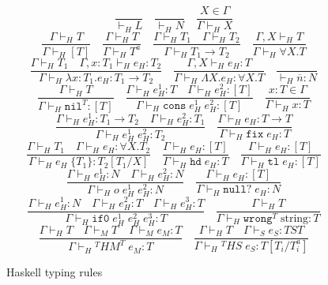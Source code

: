 \begin{figure}[p]
\[
\frac{}{\vdash_{H}L}
\quad
\frac{}{\vdash_{H}N}
\quad
\frac{X\in\Gamma}{\Gamma\vdash_{H}X}
\]
\[
\frac{\Gamma\vdash_{H}T}{\Gamma\vdash_{H}[T]}
\quad
\frac{\Gamma\vdash_{H}T}{\Gamma\vdash_{H}T^{a}}
\quad
\frac{\Gamma\vdash_{H}T_{1}\quad\Gamma\vdash_{H}T_{2}}{\Gamma\vdash_{H}T_{1}\rightarrow T_{2}}
\quad
\frac{\Gamma ,X\vdash_{H}T}{\Gamma\vdash_{H}\forall X.T}
\]
\bigskip
\[
\frac{\Gamma\vdash_{H}T_{1}\quad\Gamma,x:T_{1}\vdash_{H}e_{H}:T_{2}}{\Gamma\vdash_{H}\lambda x:T_{1}.e_{H}:T_{1}\rightarrow T_{2}}
\quad
\frac{\Gamma,X\vdash_{H}e_{H}:T}{\Gamma\vdash_{H}\Lambda X.e_{H}:\forall X.T}
\quad
\frac{}{\vdash_{H}\overline{n}:N}
\]
\[
\frac{\Gamma\vdash_{H}T}{\Gamma\vdash_{H}\mathtt{nil}^{T}:[T]}
\quad
\frac{\Gamma\vdash_{H}e_{H}^{1}:T\quad\Gamma\vdash_{H}e_{H}^{2}:[T]}{\Gamma\vdash_{H}\mathtt{cons}\;e_{H}^{1}\;e_{H}^{2}:[T]}
\quad
\frac{x:T\in\Gamma}{\Gamma\vdash_{H}x:T}
\]
\[
\frac{\Gamma\vdash_{H}e_{H}^{1}:T_{1}\rightarrow T_{2}\quad\Gamma\vdash_{H}e_{H}^{2}:T_{1}}{\Gamma\vdash_{H}e_{H}^{1}\;e_{H}^{2}:T_{2}}
\quad
\frac{\Gamma\vdash_{H}e_{H}:T\rightarrow T}{\Gamma\vdash_{H}\mathtt{fix}\;e_{H}:T}
\]
\[
\frac{\Gamma\vdash_{H}T_{1}\quad\Gamma\vdash_{H}e_{H}:\forall X.T_{2}}{\Gamma\vdash_{H}e_{H}\;\lbrace T_{1}\rbrace:T_{2}[T_{1}/X]}
\quad
\frac{\Gamma\vdash_{H}e_{H}:[T]}{\Gamma\vdash_{H}\mathtt{hd}\;e_{H}:T}
\quad
\frac{\Gamma\vdash_{H}e_{H}:[T]}{\Gamma\vdash_{H}\mathtt{tl}\;e_{H}:[T]}
\]
\[
\frac{\Gamma\vdash_{H}e_{H}^{1}:N\quad\Gamma\vdash_{H}e_{H}^{2}:N}{\Gamma\vdash_{H}o\;e_{H}^{1}\;e_{H}^{2}:N}
\quad
\frac{\Gamma\vdash_{H}e_{H}:[T]}{\Gamma\vdash_{H}\mathtt{null?}\;e_{H}:N}
\]
\[
\frac{\Gamma\vdash_{H}e_{H}^{1}:N\quad\Gamma\vdash_{H}e_{H}^{2}:T\quad\Gamma\vdash_{H}e_{H}^{3}:T}{\Gamma\vdash_{H}\mathtt{if0}\;e_{H}^{1}\;e_{H}^{2}\;e_{H}^{3}:T}
\quad
\frac{\Gamma\vdash_{H}T}{\Gamma\vdash_{H}\mathtt{wrong}^{T}\;\mathrm{string}:T}
\]
\[
\frac{\Gamma\vdash_{H}T\quad\Gamma\vdash_{M}T\quad\Gamma\vdash_{M}e_{M}:T}{\Gamma\vdash_{H}{^{T}H}M^{T}\;e_{M}:T}
\quad
\frac{\Gamma\vdash_{H}T\quad\Gamma\vdash_{S}e_{S}:TST}{\Gamma\vdash_{H}{^{T}H}S\;e_{S}:T[T_{i}/T_{i}^{a}]}
\]
\caption{Haskell typing rules}
\label{htr}
\end{figure}